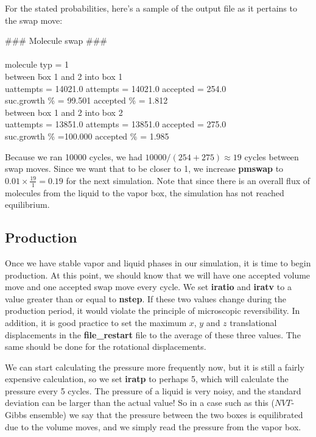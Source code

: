 \documentclass[12pt,letterpaper]{article}
\begin{document}
For the stated probabilities, here's a sample of the output
file as it pertains to the swap move:

{\bf \begin{tabbing}
\#\#\# Molecule swap \#\#\# \\
\\
 molecule typ = \hskip 24pt 1 \\
between \= box 1 and 2 into box 1\\
   \> uattempts = 14021.0 attempts = 14021.0 accepted = 254.0\\
 suc.growth \% = 99.501   accepted \% = 1.812\\
between box 1 and  2 into box 2\\
   \> uattempts = 13851.0 attempts = 13851.0 accepted = 275.0\\
 suc.growth \% =100.000   accepted \% = 1.985\\
\end{tabbing} }

Because we ran 10000 cycles, we had $10000 / (254 + 275)
\approx 19 $ cycles between swap moves. Since we want that
to be closer to 1, we increase {\bf pmswap} to $0.01 \times
\frac{19}{1} = 0.19$ for the next simulation. Note that
since there is an overall flux of molecules from the liquid
to the vapor box, the simulation has not reached
equilibrium.

\subsection{Production}
Once we have stable vapor and liquid phases in our
simulation, it is time to begin production. At this point,
we should know that we will have one accepted volume move
and one accepted swap move every cycle. We set {\bf
  iratio} and {\bf iratv} to a value greater than or equal
to {\bf nstep}. If these two values change during the
production period, it would violate the principle of
microscopic reversibility. In addition, it is good practice
to set the maximum $x$, $y$ and $z$ translational
displacements in the {\bf file\_restart} file to the average
of these three values. The same should be done for the
rotational displacements.

We can start calculating the pressure more frequently now,
but it is still a fairly expensive calculation, so we set
{\bf iratp} to perhaps 5, which will calculate the pressure
every 5 cycles. The pressure of a liquid is very noisy, and
the standard deviation can be larger than the actual value!
So in a case such as this ($NVT$-Gibbs ensemble) we say that
the pressure between the two boxes is equilibrated due to
the volume moves, and we simply read the pressure from the
vapor box.
\end{document}
